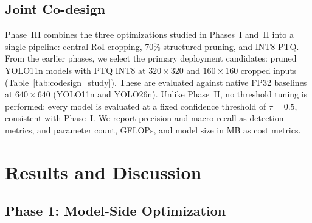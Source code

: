 \documentclass[conference]{IEEEtran}
\begin{document}
\subsection{Joint Co-design}
Phase~III combines the three optimizations studied in Phases~I and~II into a single pipeline: central RoI cropping, 70\% structured pruning, and INT8 PTQ. From the earlier phases, we select the primary deployment candidates: pruned YOLO11n models with PTQ INT8 at $320\times320$ and $160\times160$ cropped inputs (Table~\ref{tab:codesign_study}). These are evaluated against native FP32 baselines at $640\times640$ (YOLO11n and YOLO26n). Unlike Phase~II, no threshold tuning is performed: every model is evaluated at a fixed confidence threshold of $\tau=0.5$, consistent with Phase~I. We report precision and macro-recall as detection metrics, and parameter count, GFLOPs, and model size in MB as cost metrics. %


\section{Results and Discussion}
\label{sec:results}

\subsection{Phase 1: Model-Side Optimization}

\end{document}

